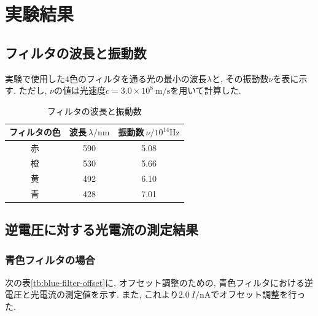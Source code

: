 \documentclass{jarticle}
\begin{document}





\section{実験結果}



\subsection{フィルタの波長と振動数}

実験で使用した$4$色のフィルタを通る光の最小の波長$\lambda$と, その振動数$\nu$を表に示す.
ただし, $\nu$の値は光速度$c = 3.0\times 10^8\ \mathrm{m/s}$を用いて計算した.

\begin{table}[H]
  \centering
  \caption{フィルタの波長と振動数}
  \label{tb:wavelength-frequency}
  \begin{tabular}{ccc}
    \hline
    フィルタの色 & 波長$\ \lambda/\mathrm{nm}$ & 振動数$\ \nu/10^{14}\mathrm{Hz}$ \\
    \hline
    赤 & 590 & 5.08 \\
    橙 & 530 & 5.66 \\
    黄 & 492 & 6.10 \\
    青 & 428 & 7.01 \\
    \hline
  \end{tabular}
\end{table}



\subsection{逆電圧に対する光電流の測定結果}



\subsubsection{青色フィルタの場合}

次の表\ref{tb:blue-filter-offset}に, オフセット調整のための, 青色フィルタにおける逆電圧と光電流の測定値を示す.
また, これより$2.0\ I/\mathrm{nA}$でオフセット調整を行った.
\end{document}
